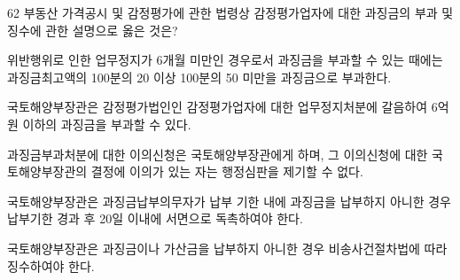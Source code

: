 \begin{question}{62}
부동산 가격공시 및 감정평가에 관한 법령상 감정평가업자에 대한 과징금의 부과 및 징수에 관한 설명으로 옳은 것은?
\begin{choices}
  \item 위반행위로 인한 업무정지가 6개월 미만인 경우로서 과징금을 부과할 수 있는 때에는 과징금최고액의 100분의 20 이상 100분의 50 미만을 과징금으로 부과한다.
  \item 국토해양부장관은 감정평가법인인 감정평가업자에 대한 업무정지처분에 갈음하여 6억원 이하의 과징금을 부과할 수 있다.
  \item 과징금부과처분에 대한 이의신청은 국토해양부장관에게 하며, 그 이의신청에 대한 국토해양부장관의 결정에 이의가 있는 자는 행정심판을 제기할 수 없다.
  \item 국토해양부장관은 과징금납부의무자가 납부 기한 내에 과징금을 납부하지 아니한 경우 납부기한 경과 후 20일 이내에 서면으로 독촉하여야 한다.
  \item 국토해양부장관은 과징금이나 가산금을 납부하지 아니한 경우 비송사건절차법에 따라 징수하여야 한다.
\end{choices}
\end{question}
